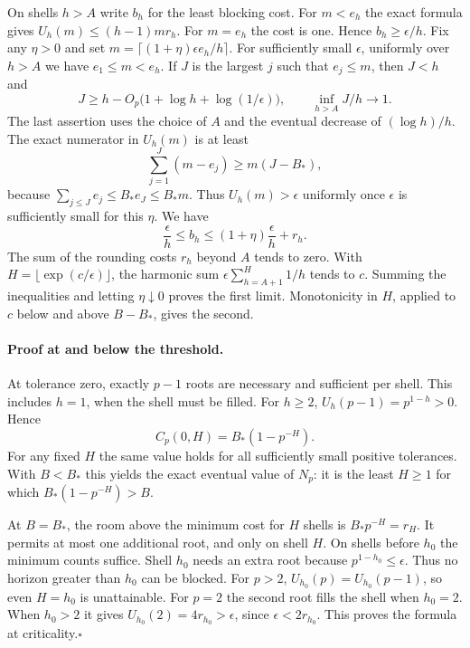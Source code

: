 On shells $h>A$ write $b_h$ for the least blocking cost. For $m<e_h$ the exact formula gives $U_h(m)\le(h-1)m r_h$. For $m=e_h$ the cost is one. Hence $b_h\ge\epsilon/h$. Fix any $\eta>0$ and set $m=\lceil(1+\eta)\epsilon e_h/h\rceil$. For sufficiently small $\epsilon$, uniformly over $h>A$ we have $e_1\le m<e_h$. If $J$ is the largest $j$ such that $e_j\le m$, then $J<h$ and
\[
 J\ge h-O_p\big(1+\log h+\log(1/\epsilon)\big),
 \qquad \inf_{h>A}J/h\longrightarrow1.
\]
The last assertion uses the choice of $A$ and the eventual decrease of $(\log h)/h$. The exact numerator in $U_h(m)$ is at least
\[
 \sum_{j=1}^{J}(m-e_j)
 \ge m(J-B_*),
\]
because $\sum_{j\le J}e_j\le B_*e_J\le B_*m$. Thus $U_h(m)>\epsilon$ uniformly once $\epsilon$ is sufficiently small for this $\eta$. We have
\[
 \frac{\epsilon}{h}\le b_h\le (1+\eta)\frac{\epsilon}{h}+r_h .
\]
The sum of the rounding costs $r_h$ beyond $A$ tends to zero. With $H=\lfloor\exp(c/\epsilon)\rfloor$, the harmonic sum $\epsilon\sum_{h=A+1}^{H}1/h$ tends to $c$. Summing the inequalities and letting $\eta\downarrow0$ proves the first limit. Monotonicity in $H$, applied to $c$ below and above $B-B_*$, gives the second.

\paragraph{Proof at and below the threshold.}
At tolerance zero, exactly $p-1$ roots are necessary and sufficient per shell. This includes $h=1$, when the shell must be filled. For $h\ge2$, $U_h(p-1)=p^{1-h}>0$. Hence
\[
 C_p(0,H)=B_*(1-p^{-H}).
\]
For any fixed $H$ the same value holds for all sufficiently small positive tolerances. With $B<B_*$ this yields the exact eventual value of $N_p$: it is the least $H\ge1$ for which $B_*(1-p^{-H})>B$.

At $B=B_*$, the room above the minimum cost for $H$ shells is $B_*p^{-H}=r_H$. It permits at most one additional root, and only on shell $H$. On shells before $h_0$ the minimum counts suffice. Shell $h_0$ needs an extra root because $p^{1-h_0}\le\epsilon$. Thus no horizon greater than $h_0$ can be blocked. For $p>2$, $U_{h_0}(p)=U_{h_0}(p-1)$, so even $H=h_0$ is unattainable. For $p=2$ the second root fills the shell when $h_0=2$. When $h_0>2$ it gives $U_{h_0}(2)=4r_{h_0}>\epsilon$, since $\epsilon<2r_{h_0}$. This proves the formula at criticality.\hfill$\square$
